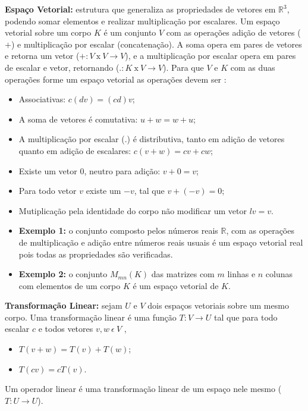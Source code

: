 \documentclass[
  openany]{book}
\providecommand{\tightlist}{%
  \setlength{\itemsep}{0pt}\setlength{\parskip}{0pt}}
\begin{document}
\textbf{Espaço Vetorial:} estrutura que generaliza as propriedades de vetores em \(\mathbb{R}^3\), podendo somar elementos e realizar multiplicação por escalares. Um espaço vetorial sobre um corpo \(K\) é um conjunto \(V\) com as operações adição de vetores (\(+\)) e multiplicação por escalar (concatenação). A soma opera em pares de vetores e retorna um vetor (\(+:V\ \mbox{x} \ V \rightarrow V\)), e a multiplicação por escalar opera em pares de escalar e vetor, retornando (\(.:K \ \mbox{x} \ V \rightarrow V\)). Para que \(V\) e \(K\) com as duas operações forme um espaço vetorial as operações devem ser \citep{algebrajeronimo}:

\begin{itemize}
\item
  Associativas: \(c(dv)=(cd)v\);
\item
  A soma de vetores é comutativa: \(u+w=w+u\);
\item
  A multiplicação por escalar (.) é distributiva, tanto em adição de vetores quanto em adição de escalares: \(c(v+w)=cv+cw\);
\item
  Existe um vetor \(0\), neutro para adição: \(v+0=v\);
\item
  Para todo vetor \(v\) existe um \(-v\), tal que \(v+(-v)=0\);
\item
  Mutiplicação pela identidade do corpo não modificar um vetor \(lv=v\).
\item
  \textbf{Exemplo 1:} o conjunto composto pelos números reais \(\mathbb{R}\), com as operações de multiplicação e adição entre números reais usuais é um espaço vetorial real pois todas as propriedades são verificadas.
\item
  \textbf{Exemplo 2:} o conjunto \(M_{mn}(K)\) das matrizes com \(m\) linhas e \(n\) colunas com elementos de um corpo \(K\) é um espaço vetorial de \(K\).
\end{itemize}

\textbf{Transformação Linear:} sejam \(U\) e \(V\) dois espaços vetoriais sobre um mesmo corpo. Uma transformação linear é uma função \(T:V\rightarrow U\) tal que para todo escalar \(c\) e todos vetores \(v,w \ \epsilon \ V\) \citep{algebrajeronimo},

\begin{itemize}
\tightlist
\item
  \(T(v+w)=T(v)+T(w)\);
\item
  \(T(cv)=cT(v)\).
\end{itemize}

Um operador linear é uma transformação linear de um espaço nele mesmo (\(T:U\rightarrow U\)).
\end{document}
